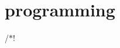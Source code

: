 \chapter{programming }
\hypertarget{md__midterm_01_reviews_2_midterm_010_2programming}{}\label{md__midterm_01_reviews_2_midterm_010_2programming}
/\texorpdfstring{$\ast$}{*}! 